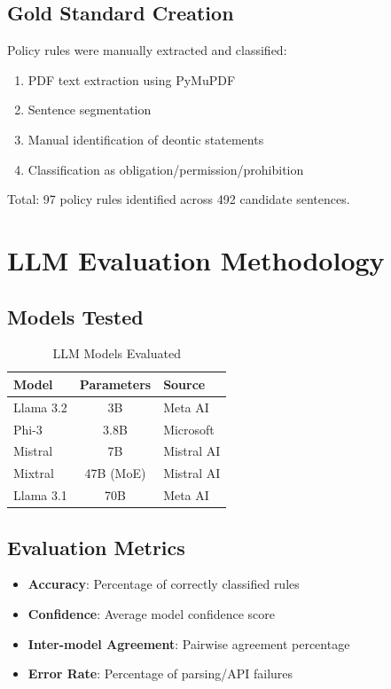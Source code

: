 \subsection{Gold Standard Creation}

Policy rules were manually extracted and classified:

\begin{enumerate}
    \item PDF text extraction using PyMuPDF
    \item Sentence segmentation
    \item Manual identification of deontic statements
    \item Classification as obligation/permission/prohibition
\end{enumerate}

Total: 97 policy rules identified across 492 candidate sentences.

\section{LLM Evaluation Methodology}

\subsection{Models Tested}

\begin{table}[h]
\centering
\caption{LLM Models Evaluated}
\begin{tabular}{|l|c|l|}
\hline
\textbf{Model} & \textbf{Parameters} & \textbf{Source} \\
\hline
Llama 3.2 & 3B & Meta AI \\
Phi-3 & 3.8B & Microsoft \\
Mistral & 7B & Mistral AI \\
Mixtral & 47B (MoE) & Mistral AI \\
Llama 3.1 & 70B & Meta AI \\
\hline
\end{tabular}
\end{table}

\subsection{Evaluation Metrics}

\begin{itemize}
    \item \textbf{Accuracy}: Percentage of correctly classified rules
    \item \textbf{Confidence}: Average model confidence score
    \item \textbf{Inter-model Agreement}: Pairwise agreement percentage
    \item \textbf{Error Rate}: Percentage of parsing/API failures
\end{itemize}

